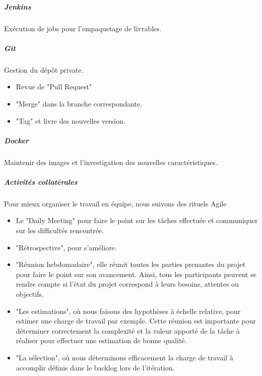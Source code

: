 \subparagraph{Jenkins} Exécution de jobs pour l'empaquetage de livrables.

\subparagraph{Git} Gestion du dépôt private.
\begin{itemize}
  \item Revue de "Pull Request"
  \item "Merge" dans la branche correspondante.
  \item "Tag" et livre des nouvelles version.
\end{itemize}

\subparagraph{Docker} Maintenir des images et l'investigation des nouvelles caractéristiques.

\subparagraph{Activités collatérales} Pour mieux organiser le travail en équipe, nous suivons des rituels Agile
\begin{itemize}
  \item Le "Daily Meeting" pour faire le point sur les tâches effectuée et communiquer sur les difficultés rencontrée.
  \item "Rétrospective", pour s’améliore.
  \item "Réunion hebdomadaire",  elle réunit toutes les parties prenantes du projet pour faire le point sur son avancement. Ainsi, tous les participants peuvent se rendre compte si l’état du projet correspond à leurs besoins, attentes ou objectifs.
  \item "Les estimations", où nous faisons des hypothèses à échelle relative, pour estimer une charge de travail par exemple. Cette réunion est importante pour déterminer correctement la complexité et la valeur apporté de la tâche à réaliser pour effectuer une estimation de bonne qualité.
  \item "La sélection", où nous déterminons efficacement la charge de travail à accomplir définis dans le backlog lors de l'itération.
\end{itemize}

